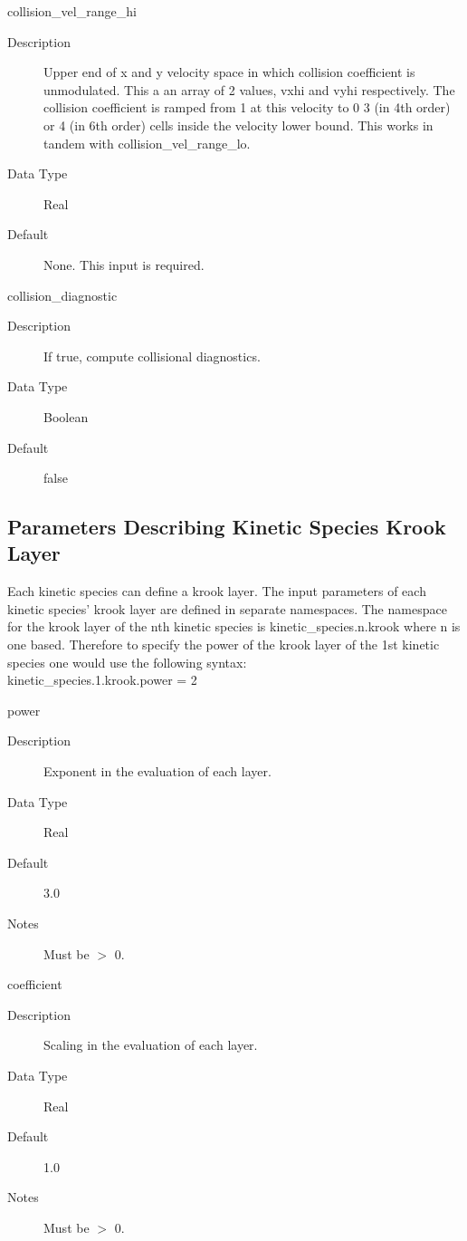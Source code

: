 \documentclass[11pt]{amsart}
\begin{document}
collision\_vel\_range\_hi
\begin{description}
\item [Description] Upper end of x and y velocity space in which collision
coefficient is unmodulated.  This a an array of 2 values, vxhi and vyhi
respectively.  The collision coefficient is ramped from 1 at this velocity to 0
3 (in 4th order) or 4 (in 6th order) cells inside the velocity lower bound.
This works in tandem with collision\_vel\_range\_lo.
\item [Data Type] Real
\item [Default] None.  This input is required.
\end{description}

collision\_diagnostic
\begin{description}
\item [Description] If true, compute collisional diagnostics.
\item [Data Type] Boolean
\item [Default] false
\end{description}

\subsection*{Parameters Describing Kinetic Species Krook Layer}
Each kinetic species can define a krook layer.  The input parameters of each
kinetic species' krook layer are defined in separate namespaces.  The namespace
for the krook layer of the nth kinetic species is kinetic\_species.n.krook
where n is one based.  Therefore to specify the power of the krook layer of the
1st kinetic species one would use the following syntax: \\
kinetic\_species.1.krook.power = 2

power
\begin{description}
\item [Description] Exponent in the evaluation of each layer.
\item [Data Type] Real
\item [Default] 3.0
\item [Notes] Must be $>$ 0.
\end{description}

coefficient
\begin{description}
\item [Description] Scaling in the evaluation of each layer.
\item [Data Type] Real
\item [Default] 1.0
\item [Notes] Must be $>$ 0.
\end{description}
\end{document}
